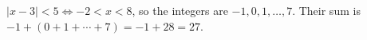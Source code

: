 \(|x-3|<5\iff -2<x<8\), so the integers are \(-1,0,1,\dots,7\). Their sum is \(-1+(0+1+\cdots+7)=-1+28=\boxed{27}\).
